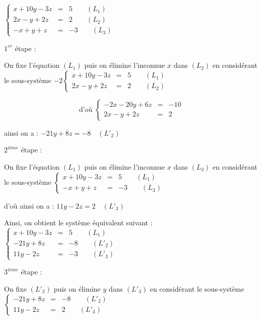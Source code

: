 \documentclass[12pt]{article}
\begin{document}
	$\left\lbrace\begin{array}{lcl}x+10y-3z& =& 5\qquad\left(L_{1}\right)\\2x-y+2z& =& 2\qquad\left(L_{2}\right)\\-x+y+z& =& -3\qquad\left(L_{3}\right)\end{array}\right.$

	$1^{er}$ étape : 


	On fixe l'équation $\left(L_{1}\right)$ puis on élimine l'inconnue $x$ dans $\left(L_{2}\right)$ en considérant le sous-système $-2\left\lbrace\begin{array}{lcl}x+10y-3z& =& 5\qquad\left(L_{1}\right)\\2x-y+2z& =& 2\qquad\left(L_{2}\right)\end{array}\right.$


	$$\text{d'où }\left\lbrace\begin{array}{lcl}-2x-20y+6z& =& -10\\2x-y+2z& =& 2\end{array}\right.$$
	
	ainsi on a : $-21y+8z=-8\quad\left(L'_{2}\right)$

$2^{ième}$ étape :

	On fixe l'équation $\left(L_{1}\right)$ puis on élimine l'inconnue $x$ dans $\left(L_{3}\right)$ en considérant le sous-système $\left\lbrace\begin{array}{lcl}x+10y-3z&=&5\qquad\left(L_{1}\right)\\-x+y+z&=&-3\qquad\left(L_{3}\right)\end{array}\right.$

	d'où ainsi on a : $11y-2z=2\quad\left(L'_{3}\right)$

	Ainsi, on obtient le système équivalent suivant : $\left\lbrace\begin{array}{lcl}x+10y-3z& =& 5\qquad\left(L_{1}\right)\\-21y+8z& =& -8\qquad\left(L'_{2}\right)\\11y-2z& =& -3\qquad\left(L'_{3}\right)\end{array}\right.$

$3^{ième}$ étape :

	On fixe $\left(L'_{2}\right)$ puis on élimine $y$ dans $\left(L'_{3}\right)$ en considérant le sous-système $\left\lbrace\begin{array}{lcl}-21y+8z& =& -8\qquad\left(L'_{2}\right)\\11y-2z& =& 2\qquad\left(L'_{3}\right)\end{array}\right.$
\end{document}
